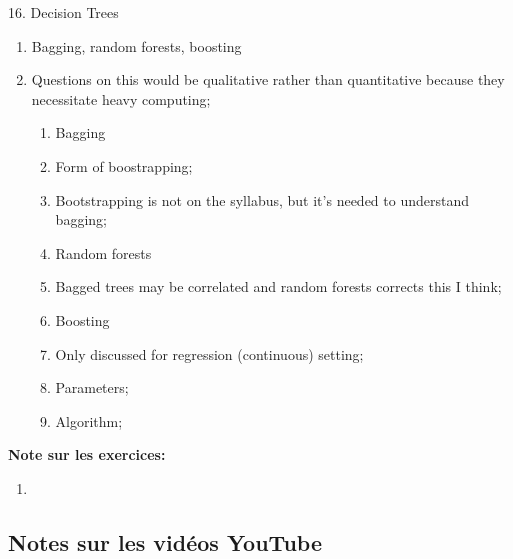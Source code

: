 \documentclass[12pt, titlepage, french]{report}
\begin{document}
\begin{CHPT_SUMM}[label = {DECISION-TREES}]{16. Decision Trees}
\begin{enumerate}
	\begin{itemize}
		\item	To optimise a \textbf{classification} tree, we minimize the classification error rate instead of the MSE;
		\item	The classification error rate is not sufficiently sensitive to grow the tree so we use the \textbf{Gini index} or the \textbf{cross-entropy} instead;		
		\item	Note on measure to use for pruning;
		\item	Residual mean deviance;
		\item	Advantages over linear models
		\item	Shortcomings;
	\end{itemize}
	\item	Bagging, random forests, boosting
	\item[]	Questions on this would be qualitative rather than quantitative because they necessitate heavy computing;
		\begin{enumerate}
		\item	Bagging	
		\item[]	Form of boostrapping;
		\item[]	Bootstrapping is not on the syllabus, but it's needed to understand bagging;
		\item	Random forests
		\item[]	Bagged trees may be correlated and random forests corrects this I think;
		\item	Boosting
		\item[]	Only discussed for regression (continuous) setting;
		\item[]	Parameters;
		\item[]	Algorithm;
		\end{enumerate}
\end{enumerate}
\textbf{Note sur les exercices:} 
	\begin{enumerate}
	\item	
	\end{enumerate}
\end{CHPT_SUMM}

\subsection{Notes sur les vidéos YouTube}
\end{document}
